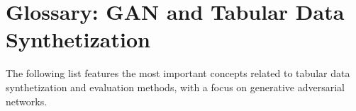 \documentclass[oneside,10pt]{book}
\begin{document}
\appendix
\chapter{Glossary: GAN and Tabular Data Synthetization}\label{aasdaaqw}

The following list features the most important concepts related to tabular data synthetization and evaluation methods, with a focus on generative adversarial networks. %




\end{document}
